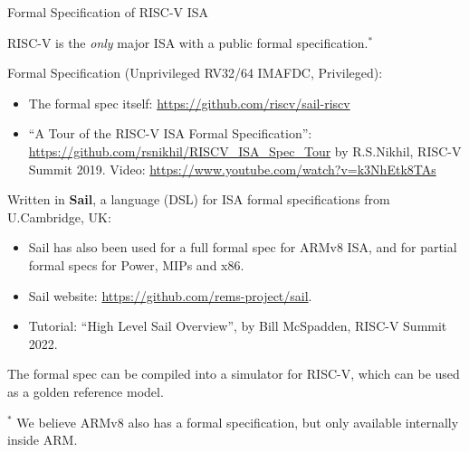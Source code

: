 \documentclass{article}
\begin{document}

\begin{center}
  {\Huge
    Formal Specification of RISC-V ISA}

  \vspace*{0.5in}

  \begin{minipage}{9in}\LARGE
    RISC-V is the \emph{only} major ISA with a public formal specification.$^*$

    \vspace{3ex}

    Formal Specification (Unprivileged RV32/64 IMAFDC, Privileged):
    \begin{itemize}
    \item The formal spec itself: \url{https://github.com/riscv/sail-riscv}

    \item ``A Tour of the RISC-V ISA Formal Specification'':
      \url{https://github.com/rsnikhil/RISCV_ISA_Spec_Tour} by
      R.S.Nikhil, RISC-V Summit 2019.
      Video: \url{https://www.youtube.com/watch?v=k3NhEtk8TAs}
    \end{itemize}

    \vspace{1ex}

    Written in {\bf Sail}, a language (DSL) for ISA formal specifications from U.Cambridge, UK:
    \begin{itemize}
    \item Sail has also been used for a full formal spec for ARMv8
      ISA, and for partial formal specs for Power, MIPs and x86.
    \item Sail website: \url{https://github.com/rems-project/sail}.
    \item Tutorial: ``High Level Sail Overview'', by Bill McSpadden, RISC-V Summit 2022.
    \end{itemize}

    \vspace{1ex}

    The formal spec can be compiled into a simulator for RISC-V, which
    can be used as a golden reference model.

  \end{minipage}

  \vfill

  \begin{minipage}{9in}\LARGE
    {\Large
    $^*$ We believe ARMv8 also has a formal specification, but only available internally inside ARM.}
  \end{minipage}


\end{center}
\end{document}
